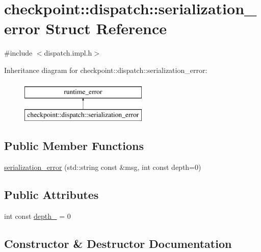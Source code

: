 \hypertarget{structcheckpoint_1_1dispatch_1_1serialization__error}{}\section{checkpoint\+:\+:dispatch\+:\+:serialization\+\_\+error Struct Reference}
\label{structcheckpoint_1_1dispatch_1_1serialization__error}


{\ttfamily \#include $<$dispatch.\+impl.\+h$>$}

Inheritance diagram for checkpoint\+:\+:dispatch\+:\+:serialization\+\_\+error\+:\begin{figure}[H]
\begin{center}
\leavevmode
\includegraphics[height=2.000000cm]{structcheckpoint_1_1dispatch_1_1serialization__error}
\end{center}
\end{figure}
\subsection*{Public Member Functions}
\begin{DoxyCompactItemize}
\item 
\hyperlink{structcheckpoint_1_1dispatch_1_1serialization__error_af6aed4ab250143188d06fe2d4d57952f}{serialization\+\_\+error} (std\+::string const \&msg, int const depth=0)
\end{DoxyCompactItemize}
\subsection*{Public Attributes}
\begin{DoxyCompactItemize}
\item 
int const \hyperlink{structcheckpoint_1_1dispatch_1_1serialization__error_ada6ac0017a7af74ce56a6bf0f8c78260}{depth\+\_\+} = 0
\end{DoxyCompactItemize}


\subsection{Constructor \& Destructor Documentation}
\mbox{\label{structcheckpoint_1_1dispatch_1_1serialization__error_af6aed4ab250143188d06fe2d4d57952f}} 
